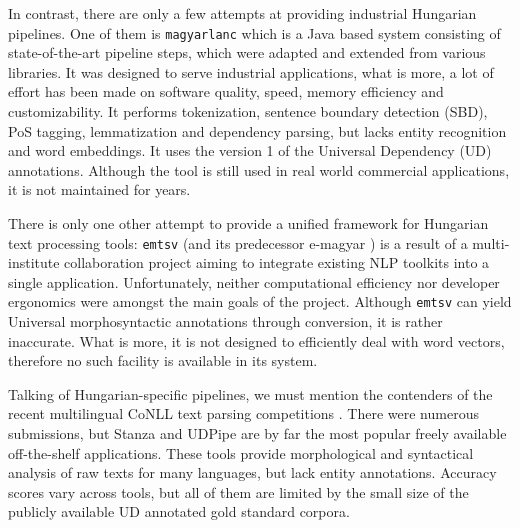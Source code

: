 \documentclass{llncs}
\newcommand{\emtsv}{\texttt{emtsv}}
\newcommand{\magyarlanc}{\texttt{magyarlanc}}
\newcommand{\udpipe}{UDPipe}
\newcommand{\stanza}{Stanza}
\begin{document}
In contrast, there are only a few attempts at providing industrial Hungarian pipelines. One of them is \magyarlanc{} \citep{magyaralanc} which is a Java based system consisting of state-of-the-art pipeline steps, which were adapted and extended from various libraries. It was designed to serve industrial applications, what is more, a lot of effort has been made on software quality, speed, memory efficiency and customizability. It performs tokenization, sentence boundary detection (SBD), PoS tagging, lemmatization and dependency parsing, but lacks entity recognition and word embeddings. It uses the version 1 of the Universal Dependency (UD) annotations. Although the tool is still used in real world commercial applications, it is not maintained for years.

There is only one other attempt to provide a unified framework for Hungarian text processing tools: \emtsv{} \citep{emtsv1, emtsv2, emtsv3} (and its predecessor e-magyar \citep{emagyar1, emagyar2}) is a result of a multi-institute collaboration project aiming to integrate existing NLP toolkits into a single application. Unfortunately, neither computational efficiency nor developer ergonomics were amongst the main goals of the project. Although \emtsv{} can yield Universal morphosyntactic annotations through conversion, it is rather inaccurate. What is more, it is not designed to efficiently deal with word vectors, therefore no such facility is available in its system.

Talking of Hungarian-specific pipelines, we must mention the contenders of the recent multilingual CoNLL text parsing competitions \citep{conll-2017, conll-2018}. There were numerous  submissions, but \stanza{} \citep{stanza} and \udpipe{} \citep{udpipe} are by far the most popular freely available off-the-shelf applications. These tools provide morphological and syntactical analysis of raw texts for many languages, but lack entity annotations. Accuracy scores vary across tools, but all of them are limited by the small size of the publicly available UD annotated gold standard corpora.
\end{document}

